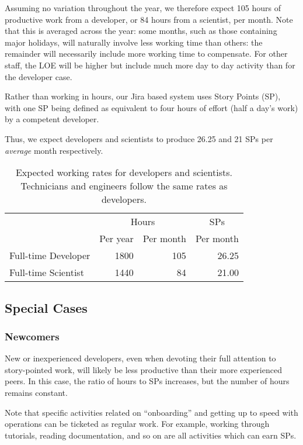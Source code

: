 Assuming no variation throughout the year, we therefore expect 105 hours of productive work from a developer, or 84 hours from a scientist, per month.
Note that this is averaged across the year: some months, such as those containing major holidays, will naturally involve less working time than others: the remainder will necessarily include more working time to compensate. For other staff, the \gls{LOE} will be higher but include much more day to day activity than for the developer case.

Rather than working in hours, our Jira based system uses Story Points (\gls{SP}), with one \gls{SP} being defined as equivalent to four hours of effort (half a day's work) by a competent developer.

Thus, we expect developers and scientists to produce 26.25 and 21 \glspl{SP} per \emph{average} month respectively.

\begin{table}
\begin{longtable}[]{@{}lrrr@{}}
\hline
          & \multicolumn{2}{c}{Hours} & \multicolumn{1}{c}{\glspl{SP}} \\
          & Per year & Per month      & Per month \\
\hline
Full-time Developer & 1800     & 105            & 26.25 \\
Full-time Scientist & 1440     &  84            & 21.00 \\
\hline
\end{longtable}
\caption{Expected working rates for developers and scientists. Technicians and engineers follow the same rates as developers.}
\label{tab:working-rate}
\end{table}

\subsection{Special Cases}

\subsubsection{Newcomers}
\label{sec:newcomers}

New or inexperienced developers, even when devoting their full attention to \gls{story}-pointed work, will likely be less productive than their more experienced peers.
In this case, the ratio of hours to \glspl{SP} increases, but the number of hours remains constant.

Note that specific activities related on ``onboarding'' and getting up to speed with operations can be ticketed as regular work.
For example, working through tutorials, reading documentation, and so on are all activities which can earn \glspl{SP}.

